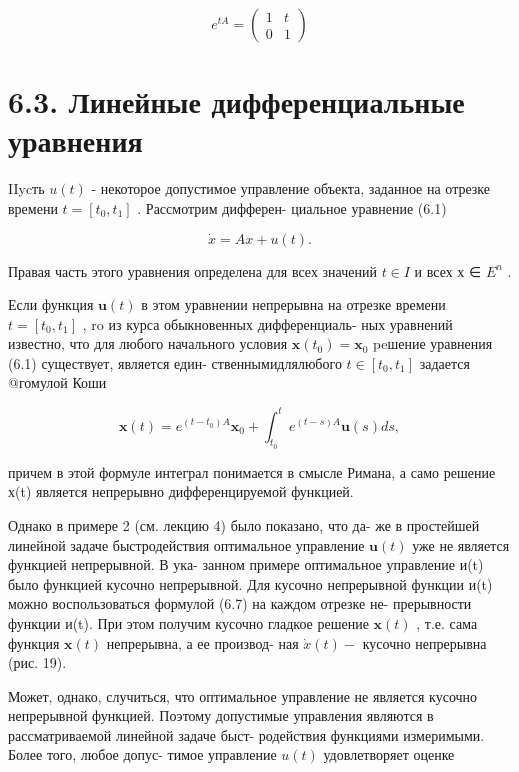 \documentclass[8pt]{extarticle}
\begin{document}
\[
{e}^{tA} = \left( \begin{array}{ll} 1 & t \\  0 & 1 \end{array}\right)
\]

\section*{6.3. Линейные дифференциальные уравнения}

IIycть \(u\left( t\right)\) - некоторое допустимое управление объекта, заданное на отрезке времени \(t = \left\lbrack  {{t}_{0},{t}_{1}}\right\rbrack\) . Рассмотрим дифферен- циальное уравнение (6.1)

\[
\dot{x} = {Ax} + u\left( t\right) .
\]

Правая часть этого уравнения определена для всех значений \(t \in  I\) и всех х ∈ \({E}^{n}\) .

Если функция \(\mathbf{u}\left( t\right)\) в этом уравнении непрерывна на отрезке времени \(t = \left\lbrack  {{t}_{0},{t}_{1}}\right\rbrack\) , ro из курса обыкновенных дифференциаль- ных уравнений известно, что для любого начального условия \(\mathbf{x}\left( {t}_{0}\right)  = {\mathbf{x}}_{0}\) peшение уравнения (6.1) существует, является един- ственнымидлялюбого \(t \in  \left\lbrack  {{t}_{0},{t}_{1}}\right\rbrack\) задается @гомулой Коши

\[
\mathbf{x}\left( t\right)  = {e}^{\left( {t - {t}_{0}}\right) A}{\mathbf{x}}_{0} + {\int }_{{t}_{0}}^{t}{e}^{\left( {t - s}\right) A}\mathbf{u}\left( s\right) {ds}, \tag{6.7}
\]

причем в этой формуле интеграл понимается в смысле Римана, а само решение х(t) является непрерывно дифференцируемой функцией.

Однако в примере 2 (см. лекцию 4) было показано, что да- же в простейшей линейной задаче быстродействия оптимальное управление \(\mathbf{u}\left( t\right)\) уже не является функцией непрерывной. В ука- занном примере оптимальное управление и(t) было функцией кусочно непрерывной. Для кусочно непрерывной функции и(t) можно воспользоваться формулой (6.7) на каждом отрезке не- прерывности функции и(t). При этом получим кусочно гладкое решение \(\mathbf{x}\left( t\right)\) , т.е. сама функция \(\mathbf{x}\left( t\right)\) непрерывна, а ее производ- ная \(\dot{x}\left( t\right)  -\) кусочно непрерывна (рис. 19).

Может, однако, случиться, что оптимальное управление не является кусочно непрерывной функцией. Поэтому допустимые управления являются в рассматриваемой линейной задаче быст- родействия функциями измеримыми. Более того, любое допус- тимое управление \(u\left( t\right)\) удовлетворяет оценке
\end{document}
